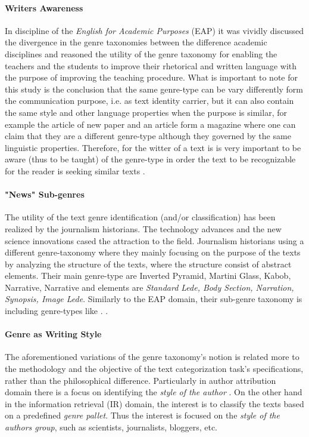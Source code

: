 \paragraph{Writers Awareness} In discipline of the \textit{English for Academic Purposes} (EAP)  it was vividly discussed the divergence in the genre taxonomies between the difference academic disciplines and reasoned the utility of the genre taxonomy for enabling the teachers and the students to improve their rhetorical and written language with the purpose of improving the teaching procedure. What is important to note for this study is the conclusion that the same genre-type can be vary differently form the communication purpose, i.e. as text identity carrier, but it can also contain the same style and other language properties when the purpose is similar, for example the article of new paper and an article form a magazine where one can claim that they are a different genre-type although they governed by the same linguistic properties. Therefore, for the witter of a text is is very important to be aware (thus to be taught) of the genre-type in order the text to be recognizable for the reader is seeking similar texts \parencite{hardy2016genre,melissourgou2017genre,al2017genre}.

\paragraph{"News" Sub-genres} The utility of the text genre identification (and/or classification) has been realized by the journalism historians. The technology advances and the new science innovations cased the attraction to the field. Journalism historians using a different genre-taxonomy where they mainly focusing on the purpose of the texts by analyzing the structure of the texts, where the structure consist of abstract elements. Their main genre-type are Inverted Pyramid, Martini Glass, Kabob, Narrative, Narrative and elements are \textit{Standard Lede, Body Section,  Narration, Synopsis, Image Lede}.  Similarly to the EAP domain, their sub-genre taxonomy is including genre-types like . \parencite{dai2018fine}.

\paragraph{Genre as Writing Style} The aforementioned variations of the genre taxonomy's notion is related more to the methodology and the objective of the text categorization task's specifications, rather than the philosophical difference. Particularly in author attribution domain there is a focus on identifying the \textit{style of the author} \parencite{stamatatos2009survey,koppel2011authorship,koppel2014determining}. On the other hand in the information retrieval (IR) domain, the interest is to classify the texts based on a predefined \textit{genre pallet}. Thus the interest is focused on the \textit{style of the authors group}, such as scientists, journalists, bloggers, etc.

